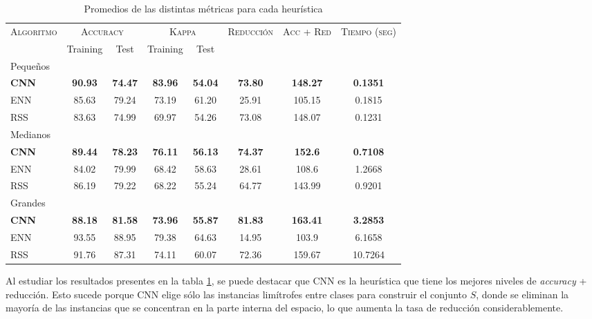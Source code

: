 \begin{table}[h!]
\centering
\begin{adjustbox}{max width =\textwidth}
\begin{tabular}{l c c c c c c c}
\hline
\multirow{2}{*}{\textsc{Algoritmo}}
	& \multicolumn{2}{c}{\textsc{Accuracy}}
	& \multicolumn{2}{c}{\textsc{Kappa}}
	& \textsc{Reducción}
	& \textsc{Acc + Red}
	& \textsc{Tiempo (seg)} \\
	& Training & Test
	& Training & Test \\ 
\hline
\hline

Pequeños\\
\textbf{CNN} & \textbf{90.93} & \textbf{74.47} & \textbf{83.96} & \textbf{54.04} & \textbf{73.80} & \textbf{148.27} & \textbf{0.1351} \\
ENN & 85.63 & 79.24 & 73.19 & 61.20 & 25.91 & 105.15 & 0.1815 \\
RSS & 83.63 & 74.99 & 69.97 & 54.26 & 73.08 & 148.07 & 0.1231 \\

\hline

Medianos\\
\textbf{CNN} & \textbf{89.44} & \textbf{78.23} & \textbf{76.11} & \textbf{56.13} & \textbf{74.37} & \textbf{152.6} & \textbf{0.7108} \\
ENN & 84.02 & 79.99 & 68.42 & 58.63 & 28.61 & 108.6 & 1.2668 \\
RSS & 86.19 & 79.22 & 68.22 & 55.24 & 64.77 & 143.99 & 0.9201 \\

\hline

Grandes\\
\textbf{CNN} & \textbf{88.18} & \textbf{81.58} & \textbf{73.96} & \textbf{55.87} & \textbf{81.83} & \textbf{163.41} & \textbf{3.2853} \\
ENN & 93.55 & 88.95 & 79.38 & 64.63 & 14.95 & 103.9 & 6.1658 \\
RSS & 91.76 & 87.31 & 74.11 & 60.07 & 72.36 & 159.67 & 10.7264 \\


\hline
\end{tabular}
\end{adjustbox}
\caption{Promedios de las distintas métricas para cada heurística}
\label{heu}
\end{table}

Al estudiar los resultados presentes en la tabla \ref{heu}, se puede destacar que CNN es la heurística que tiene los mejores niveles de \emph{accuracy} + reducción. Esto sucede porque CNN elige sólo las instancias limítrofes entre clases para construir el conjunto $S$, donde se eliminan la mayoría de las instancias que se concentran en la parte interna del espacio, lo que aumenta la tasa de reducción considerablemente.

